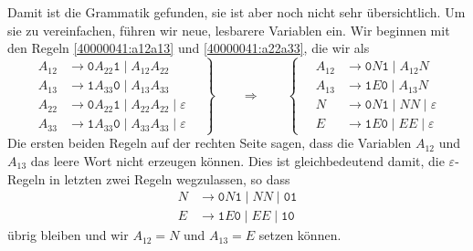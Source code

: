 \begin{loesung}
Damit ist die Grammatik gefunden, sie ist aber noch nicht sehr übersichtlich.
Um sie zu vereinfachen, führen wir neue, lesbarere Variablen ein.
Wir beginnen mit den Regeln \eqref{40000041:a12a13} und \eqref{40000041:a22a33},
die wir als
\[
\left.
\begin{aligned}
A_{12}&\to\texttt{0} A_{22}\texttt{1} \;|\; A_{12}A_{22}\\
A_{13}&\to\texttt{1} A_{33}\texttt{0} \;|\; A_{13}A_{33}\\
A_{22}&\to \texttt{0}A_{22}\texttt{1} \;|\; A_{22}A_{22} \;|\; \varepsilon\\
A_{33}&\to \texttt{1}A_{33}\texttt{0} \;|\; A_{33}A_{33} \;|\; \varepsilon
\end{aligned}
\quad
\right\}
\qquad\Rightarrow\qquad
\left\{
\quad
\begin{aligned}
A_{12}&\to\texttt{0} N\texttt{1} \;|\; A_{12}N \\
A_{13}&\to\texttt{1} E\texttt{0} \;|\; A_{13}N \\
N &\to \texttt{0} N \texttt{1} \;|\; NN \;|\; \varepsilon\\
E &\to \texttt{1} E \texttt{0} \;|\; EE \;|\; \varepsilon
\end{aligned}
\right.
\]
Die ersten beiden Regeln auf der rechten Seite sagen, dass die Variablen
$A_{12}$ und $A_{13}$ das leere Wort nicht erzeugen können.
Dies ist gleichbedeutend damit, die $\varepsilon$-Regeln in letzten zwei 
Regeln wegzulassen, so dass 
\begin{equation}
\begin{aligned}
N &\to \texttt{0} N \texttt{1} \;|\; NN \;|\; \texttt{01}\\
E &\to \texttt{1} E \texttt{0} \;|\; EE \;|\; \texttt{10}
\end{aligned}
\label{40000041:NE}
\end{equation}
übrig bleiben und wir $A_{12}=N$ und $A_{13}=E$ setzen können.


\end{loesung}
